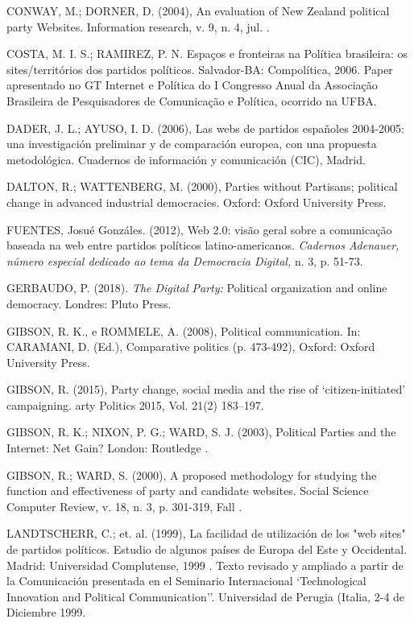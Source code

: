 CONWAY, M.; DORNER, D. (2004), An evaluation of New Zealand political
party Websites. Information research, v. 9, n. 4, jul. .

COSTA, M. I. S.; RAMIREZ, P. N. Espaços e fronteiras na Política
brasileira: os sites/territórios dos partidos políticos. Salvador-BA:
Compolítica, 2006. Paper apresentado no GT Internet e Política do I
Congresso Anual da Associação Brasileira de Pesquisadores de Comunicação
e Política, ocorrido na UFBA.

DADER, J. L.; AYUSO, I. D. (2006), Las webs de partidos españoles
2004-2005: una investigación preliminar y de comparación europea, con
una propuesta metodológica. Cuadernos de información y comunicación
(CIC), Madrid.

DALTON, R.; WATTENBERG, M. (2000), Parties without Partisans; political
change in advanced industrial democracies. Oxford: Oxford University
Press.

FUENTES, Josué Gonzáles. (2012), Web 2.0: visão geral sobre a
comunicação baseada na web entre partidos políticos latino-americanos.
\emph{Cadernos Adenauer, número especial dedicado ao tema da Democracia
Digital,} n. 3, p. 51-73.

GERBAUDO, P. (2018). \emph{The Digital Party:} Political organization
and online democracy. Londres: Pluto Press.

GIBSON, R. K., e ROMMELE, A. (2008), Political communication. In:
CARAMANI, D. (Ed.), Comparative politics (p. 473-492), Oxford: Oxford
University Press.

GIBSON, R. (2015), Party change, social media and the rise of
`citizen-initiated' campaigning. arty Politics 2015, Vol. 21(2)
183--197.

GIBSON, R. K.; NIXON, P. G.; WARD, S. J. (2003), Political Parties and
the Internet: Net Gain? London: Routledge .

GIBSON, R.; WARD, S. (2000), A proposed methodology for studying the
function and effectiveness of party and candidate websites. Social
Science Computer Review, v. 18, n. 3, p. 301-319, Fall .

LANDTSCHERR, C.; et. al. (1999), La facilidad de utilización de los "web
sites" de partidos políticos. Estudio de algunos países de Europa del
Este y Occidental. Madrid: Universidad Complutense, 1999 . Texto
revisado y ampliado a partir de la Comunicación presentada en el
Seminario Internacional `Technological Innovation and Political
Communication''. Universidad de Perugia (Italia, 2-4 de Diciembre 1999.

